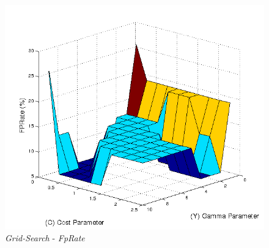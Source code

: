 \begin{figure}[!h]
 \centering
 \includegraphics[scale=0.7]{./img/gridsearchfprate.png}
\caption{\textit{Grid-Search} - \textit{FpRate}}
 \label{fig:gridfprate}
\end{figure}




